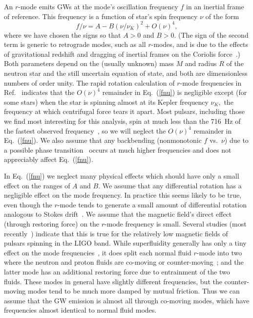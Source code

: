 \documentclass{ttuthes2007}
\begin{document}
An $r$-mode emits \acp{GW} at the mode's oscillation frequency $f$ in an
inertial frame of reference.
This frequency is a function of star's spin frequency $\nu$ of the
form~\cite[e.g.]{Yoshida:2004gk}
\begin{equation}
\label{fnu}
f/\nu = A - B \left( \nu / \nu_K \right)^2 + O(\nu)^4,
\end{equation}
where we have chosen the signs so that $A>0$ and $B>0.$
(The sign of the second term is generic to retrograde modes, such as all
$r$-modes, and is due to the effects of gravitational redshift and dragging of
inertial frames on the Coriolis force~\cite{Paschalidis:2016vmz}.)
Both parameters depend on the (usually unknown) mass $M$ and radius $R$ of the
neutron star and the still uncertain equation of state, and both are
dimensionless numbers of order unity.
The rapid rotation calculation of $r$-mode frequencies in
Ref.~\cite{Yoshida:2004gk} indicates that the $O(\nu)^4$ remainder in
Eq.~(\ref{fnu}) is negligible except (for some stars) when the star is
spinning almost at its Kepler frequency $\nu_K,$ the frequency at which
centrifugal force tears it apart.
Most pulsars, including those we find most interesting for this analysis, spin
at much less than the 716~Hz of the fastest observed
frequency~\cite{Manchester:2004bp}, so we will neglect the $O(\nu)^4$
remainder in Eq.~(\ref{fnu}).
We also assume that any backbending (nonmonotonic $f$ vs.\ $\nu$) due to a
possible phase transition~\cite{Glendenning:1997fy} occurs at much higher
frequencies and does not appreciably affect Eq.~(\ref{fnu}).

In Eq.~(\ref{fnu}) we neglect many physical effects which should have only a
small effect on the ranges of $A$ and $B.$
We assume that any differential rotation has a negligible effect on the mode
frequency.
In practice this seems likely to be true, even though the $r$-mode tends to
generate a small amount of differential rotation analogous to Stokes
drift~\cite{Friedman:2017wfi}.
We assume that the magnetic field's direct effect (through restoring force) on
the $r$-mode frequency is small.
Several studies (most recently~\cite{Jasiulek:2016epr}) indicate that this is
true for the relatively low magnetic fields of pulsars spinning in the LIGO
band.
While superfluidity generally has only a tiny effect on the mode
frequencies~\cite{Lindblom:1999wi}, it does split each normal fluid $r$-mode
into two where the neutron and proton fluids are co-moving or
counter-moving~\cite{Andersson:2001bz}; and the latter mode has an additional
restoring force due to entrainment of the two fluids.
These modes in general have slightly different frequencies, but the
counter-moving modes tend to be much more damped by mutual friction.
Thus we can assume that the \ac{GW} emission is almost all through co-moving
modes, which have frequencies almost identical to normal fluid modes.
\end{document}
